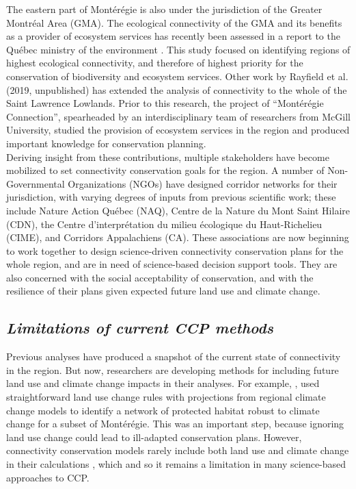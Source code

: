 \documentclass[12pt,Bold,TexShade]{thesis/mcgilletdclass}
\begin{document}
{The eastern part of Montérégie is also under the jurisdiction of the Greater Montréal Area (GMA). The ecological connectivity of the GMA and its benefits as a provider of ecosystem services has recently been assessed in a report to the Québec ministry of the environment \citep{rayfield_priorisation_2018}. This study focused on identifying regions of highest ecological connectivity, and therefore of highest priority for the conservation of biodiversity and ecosystem services. Other work by Rayfield et al. (2019, unpublished) has extended the analysis of connectivity to the whole of the Saint Lawrence Lowlands. Prior to this research, the project of “Montérégie Connection”, spearheaded by an interdisciplinary team of researchers from McGill University, studied the provision of ecosystem services in the region and produced important knowledge for conservation planning. \\

Deriving insight from these contributions, multiple stakeholders have become mobilized to set connectivity conservation goals for the region. A number of Non-Governmental Organizations (NGOs) have designed corridor networks for their jurisdiction, with varying degrees of inputs from previous scientific work; these include Nature Action Québec (NAQ), Centre de la Nature du Mont Saint Hilaire (CDN), the Centre d'interprétation du milieu écologique du Haut-Richelieu (CIME), and Corridors Appalachiens (CA). These associations are now beginning to work together to design science-driven connectivity conservation plans for the whole region, and are in need of science-based decision support tools. They are also concerned with the social acceptability of conservation, and with the resilience of their plans given expected future land use and climate change. \\ \vspace{2em}

\subsection*{\textit{Limitations of current CCP methods \\ \vspace{1em}}}

Previous analyses have produced a snapshot of the current state of connectivity in the region. But now, researchers are developing methods for including future land use and climate change impacts in their analyses. For example, \cite{albert_applying_2017}, used straightforward land use change rules with projections from regional climate change models to identify a network of protected habitat robust to climate change for a subset of Montérégie. This was an important step, because ignoring land use change could lead to ill-adapted conservation plans. However, connectivity conservation models rarely include both land use and climate change in their calculations \citep{costanza_landscape_2019}, which and so it remains a limitation in many science-based approaches to  CCP. \\

}
\end{document}
